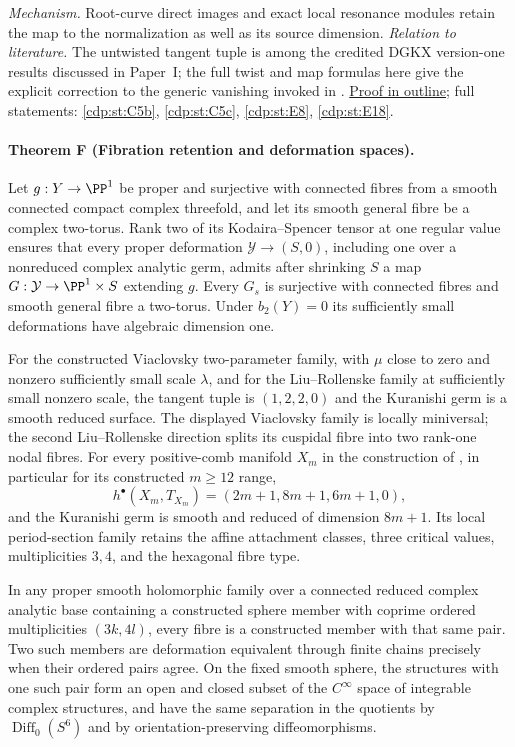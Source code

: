 \textit{Mechanism.} Root-curve direct images and exact local
resonance modules retain the map to the normalization as well as
its source dimension.
\textit{Relation to literature.} The untwisted tangent tuple is
among the credited DGKX version-one results discussed in Paper~I;
the full twist and map formulas here give the explicit correction
to the generic vanishing invoked in \cite[Theorem~2.2]{CDP2020}.
\hyperlink{outline-II-E}{Proof in outline}; full statements:
\ref{cdp:st:C5b}, \ref{cdp:st:C5c}, \ref{cdp:st:E8},
\ref{cdp:st:E18}.

\hypertarget{main-II-F}{}
\paragraph{Theorem F (Fibration retention and deformation spaces).}
\label{series:II:F}
Let $g:Y\to\PP^1$ be proper and surjective with connected fibres
from a smooth connected compact complex threefold, and let its
smooth general fibre be a complex two-torus. Rank two of its
Kodaira--Spencer tensor at one regular value ensures that every
proper deformation $\mathcal Y\to(S,0)$, including one over a
nonreduced complex analytic germ, admits after shrinking $S$ a
map $G:\mathcal Y\to\PP^1\times S$ extending $g$. Every $G_s$
is surjective with connected fibres and smooth general fibre a
two-torus. Under $b_2(Y)=0$ its sufficiently small deformations
have algebraic dimension one.

For the constructed Viaclovsky two-parameter family, with
$\mu$ close to zero and nonzero sufficiently small scale
$\lambda$, and for the Liu--Rollenske family at sufficiently
small nonzero scale, the tangent tuple is $(1,2,2,0)$ and the
Kuranishi germ is a smooth reduced surface. The displayed
Viaclovsky family is locally miniversal; the second
Liu--Rollenske direction splits its cuspidal fibre into two
rank-one nodal fibres. For every positive-comb manifold $X_m$
in the construction of \cite{Viaclovsky2026Combs}, in particular
for its constructed $m\ge12$ range,
\[
 h^\bullet(X_m,T_{X_m})=(2m+1,8m+1,6m+1,0),
\]
and the Kuranishi germ is smooth and reduced of dimension $8m+1$.
Its local period-section family retains the affine attachment
classes, three critical values, multiplicities $3,4$, and the
hexagonal fibre type.

In any proper smooth holomorphic family over a connected reduced
complex analytic base containing a constructed sphere member with
coprime ordered multiplicities $(3k,4l)$, every fibre is a
constructed member with that same pair. Two such members are
deformation equivalent through finite chains precisely when their
ordered pairs agree. On the fixed smooth sphere, the structures
with one such pair form an open and closed subset of the
$C^\infty$ space of integrable complex structures, and have the
same separation in the quotients by $\operatorname{Diff}_0(S^6)$
and by orientation-preserving diffeomorphisms.

